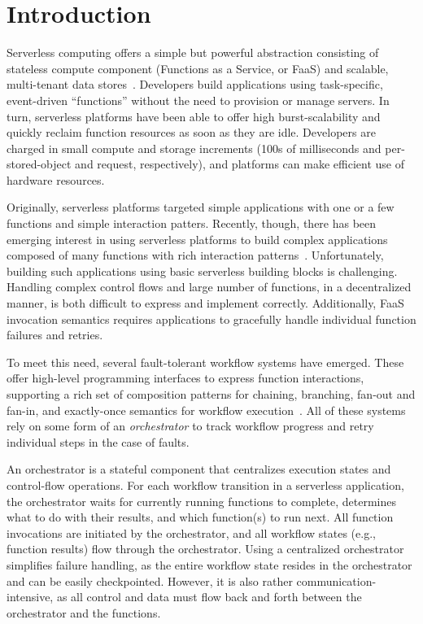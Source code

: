 \section{Introduction}

Serverless computing offers a simple but powerful abstraction consisting of
stateless compute component (Functions as a Service, or FaaS) and scalable,
multi-tenant data stores~\cite{berkeley}. Developers build applications using
task-specific, event-driven ``functions'' without the need to provision or
manage servers. In turn, serverless platforms have been able to offer high
burst-scalability and quickly reclaim function resources as soon as they are
idle. Developers are charged in small compute and storage increments (100s of
milliseconds and per-stored-object and request, respectively), and platforms
can make efficient use of hardware resources.

Originally, serverless platforms targeted simple applications with one or a few
functions and simple interaction patters. Recently, though, there has been
emerging interest in using serverless platforms to build complex applications
composed of many  functions with rich interaction patterns~\cite{excamera,
pywren, gg-atc, beldi, boki}. Unfortunately, building such applications using
basic serverless building blocks is challenging.  Handling complex control flows and large number of functions, in a decentralized  manner, is both
difficult to  express and implement correctly. Additionally, FaaS invocation semantics
requires applications  to gracefully handle individual function failures and retries. 

To meet this need, several fault-tolerant workflow systems  have emerged. These offer high-level
programming interfaces to express function interactions, supporting a rich set of
composition patterns for chaining, branching, fan-out and fan-in, and
exactly-once semantics for workflow execution~\cite{excamera, gg-atc,
aws-step-functions, google-cloud-composer, google-workflows, durable-functions}.
All of these systems rely on some form of an \emph{orchestrator} to track workflow progress
and retry individual steps in the case of faults.

An orchestrator is a stateful component that centralizes execution states
and control-flow operations. For each workflow transition in a serverless
application, the orchestrator waits for currently running functions to complete,
determines what to do with their results, and which function(s) to run
next. All function invocations are initiated by the orchestrator, and all
workflow states (e.g., function results) flow through the orchestrator. Using a 
centralized orchestrator simplifies failure handling, as the entire workflow state resides
in the orchestrator and can be easily checkpointed. However, it is also rather
communication-intensive, as all control and data must flow back and forth between
the orchestrator and the functions.

